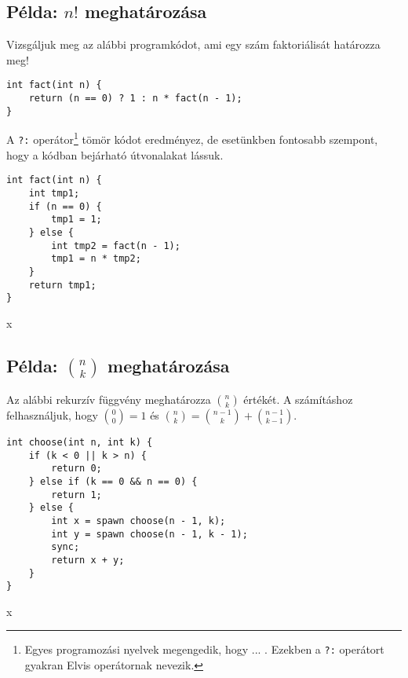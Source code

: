
\subsection{Példa: $n!$ meghatározása}

Vizsgáljuk meg az alábbi programkódot, ami egy szám faktoriálisát határozza meg!

\begin{lstlisting}
int fact(int n) {
	return (n == 0) ? 1 : n * fact(n - 1);
}
\end{lstlisting}

A \lstinline{?:} operátor\footnote{Egyes programozási nyelvek megengedik, hogy ... . Ezekben a \lstinline{?:} operátort gyakran Elvis operátornak nevezik.} tömör kódot eredményez, de esetünkben fontosabb szempont, hogy a kódban bejárható útvonalakat lássuk.

\begin{minipage}{0.5\linewidth}
\begin{lstlisting}
int fact(int n) {
	int tmp1;
	if (n == 0) {
		tmp1 = 1;
	} else {
		int tmp2 = fact(n - 1);
		tmp1 = n * tmp2;
	}
	return tmp1;
}
\end{lstlisting}
\end{minipage}
\begin{minipage}{0.5\linewidth}
	x
\end{minipage}

\subsection{Példa: $n \choose k$ meghatározása}

Az alábbi rekurzív függvény meghatározza $n \choose k$ értékét. A számításhoz felhasználjuk, hogy ${0 \choose 0} = 1$ és ${n \choose k} = {n-1 \choose k} + {n-1 \choose k-1}$.


\begin{minipage}{0.5\linewidth}
\begin{lstlisting}
int choose(int n, int k) {
	if (k < 0 || k > n) {
		return 0;
	} else if (k == 0 && n == 0) {
		return 1;
	} else {
		int x = spawn choose(n - 1, k);
		int y = spawn choose(n - 1, k - 1);
		sync;
		return x + y;
	}
}
\end{lstlisting}
\end{minipage}
\begin{minipage}{0.5\linewidth}
	x
\end{minipage}



